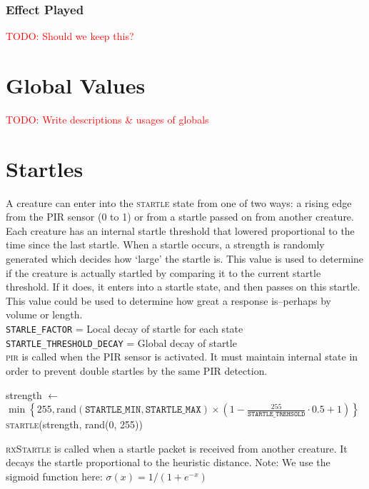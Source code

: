 \documentclass{article}
\newcommand\code{\texttt}
\newcommand\assign{\ensuremath{\leftarrow}~}
\newcommand\rand{\text{rand}}
\newcommand\todo[1]{\textcolor{red}{TODO: #1}}
\begin{document}
\subsubsection{Effect Played}
\todo{Should we keep this?}
\endgroup


\section{Global Values}
\todo{Write descriptions \& usages of globals}

\clearpage
\section{Startles}
A creature can enter into the \textsc{startle} state from one of two ways: a rising edge from the PIR sensor (0 to 1) or from a startle passed on from another creature. 
Each creature has an internal startle threshold that lowered proportional to the time since the last startle.
When a startle occurs, a strength is randomly generated which decides how `large' the startle is.
This value is used to determine if the creature is actually startled by comparing it to the current startle threshold. If it does, it enters into a startle state, and then passes on this startle.
This value could be used to determine how great a response is--perhaps by volume or length.\\
\code{STARLE\_FACTOR} = Local decay of startle for each state\\
\code{STARTLE\_THRESHOLD\_DECAY} = Global decay of startle\\

\textsc{pir} is called when the PIR sensor is activated. It must maintain internal state in order to prevent double startles by the same PIR detection.
\begin{algorithm}
    \begin{algorithmic}[1]
                \State strength \assign $\min\left\{255, \rand(\code{STARTLE\_MIN},  \code{STARTLE\_MAX}) \times \left(1 - \frac{255}{\code{STARTLE\_TREHSOLD}} \cdot 0.5 + 1\right)\right\}$\\
                \State \textsc{startle}(strength, rand(0, 255))
            \EndIf
        \EndFunction
    \end{algorithmic}
\end{algorithm}

\textsc{rxStartle} is called when a startle packet is received from another creature. It decays the startle proportional to the heuristic distance. Note: We use the sigmoid function here: $\sigma(x) = 1/(1 + e^{-x})$\\
\end{document}
